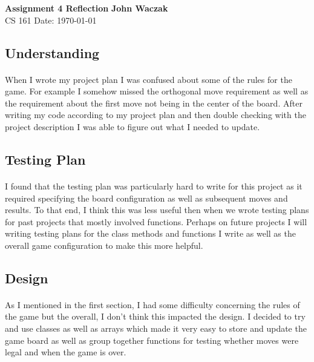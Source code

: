 \documentclass[a4paper, 11pt]{article}
\begin{document}
\noindent
\large\textbf{Assignment 4 Reflection} \hfill \textbf{John Waczak} \\
\normalsize CS 161 \hfill  Date: \today \\

\subsection*{Understanding}
	\paragraph{}
	When I wrote my project plan I was confused about some of the rules for the game. For example I somehow missed the orthogonal move requirement as well as the requirement about the first move not being in the center of the board. After writing my code according to my project plan and then double checking with the project description I was able to figure out what I needed to update. 
	
\subsection*{Testing Plan}
	\paragraph{}
	I found that the testing plan was particularly hard to write for this project as it required specifying the board configuration as well as subsequent moves and results. To that end, I think this was less useful then when we wrote testing plans for past projects that mostly involved functions. Perhaps on future projects I will writing testing plans for the class methods and functions I write as well as the overall game configuration to make this more helpful.

\subsection*{Design}
	\paragraph{}
	As I mentioned in the first section, I had some difficulty concerning the rules of the game but the overall, I don't think this impacted the design. I decided to try and use classes as well as arrays which made it very easy to store and update the game board as well as group together functions for testing whether moves were legal and when the game is over. 
\end{document}
